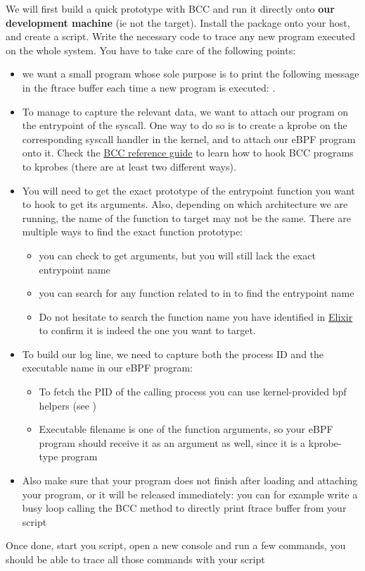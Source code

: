 We will first build a quick prototype with BCC and run it directly onto \textbf{our development machine} (ie not the target). Install the  package onto your host, and create a  script. Write the necessary code to trace any new program executed on the whole system. You have to take care of the following points:
\begin{itemize}
  \item we want a small program whose sole purpose is to print the following message in the ftrace buffer each time a new program is executed: .
  \item To manage to capture the relevant data, we want to attach our program
  on the entrypoint of the  syscall. One way to do so is to create
  a kprobe on the corresponding syscall handler in the kernel, and to attach
  our eBPF program onto it. Check the
  \href{https://github.com/iovisor/bcc/blob/master/docs/reference_guide.md}{BCC
  reference guide} to learn how to hook BCC programs to kprobes (there are at
  least two different ways).
  \item You will need to get the exact prototype of the 
  entrypoint function you want to hook to get its arguments. Also, depending on
  which architecture we are running, the name of the function to target may not
  be the same. There are multiple ways to find the exact function prototype:
  \begin{itemize}
    \item you can check  to get  arguments, but
    you will still lack the exact entrypoint name
    \item you can search for any function related to  in
     to find the
    entrypoint name
    \item Do not hesitate to search the function name you have identified in
    \href{https://elixir.bootlin.com/}{Elixir} to confirm it is indeed the one
    you want to target.
  \end{itemize}
  \item To build our log line, we need to capture both the process ID and the
  executable name in our eBPF program:
  \begin{itemize}
    \item To fetch the PID of the calling process you can use kernel-provided bpf helpers (see )
    \item Executable filename is one of the  function arguments, so your eBPF program should receive it as an argument as well, since it is a kprobe-type program
  \end{itemize}
  \item Also make sure that your program does not finish after loading and attaching your program, or it will be released immediately: you can for example write a busy loop calling the BCC method  to directly print ftrace buffer from your script
\end{itemize}
Once done, start you script, open a new console and run a few commands, you should be able to trace all those commands with your script

